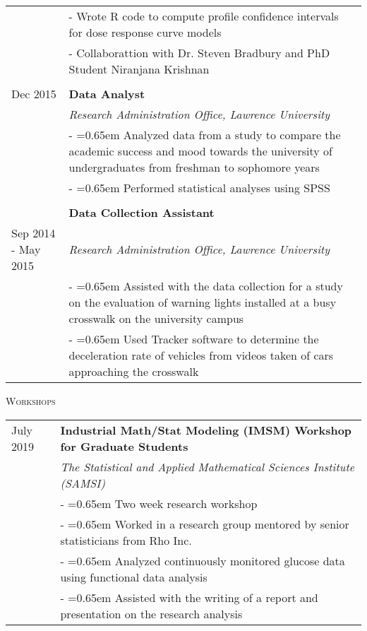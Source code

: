 \documentclass[10pt, oneside]{article}
\begin{document}
\begin{longtable}{p{3.5cm}p{13cm}}
& - Wrote R code to compute profile confidence intervals for dose response curve models\\
& - Collaborattion with Dr. Steven Bradbury and PhD Student Niranjana Krishnan\\
\\
\hfill{Dec 2015} & \textbf{Data Analyst}\\
& \emph{Research Administration Office, Lawrence University} \vspace{0.1cm}\\
& - \hangindent=0.65em \hangafter=1 Analyzed data from a study to compare the academic success and mood towards the university of undergraduates from freshman to sophomore years\\
& - \hangindent=0.65em \hangafter=1 Performed statistical analyses using SPSS\\
\\
& \textbf{Data Collection Assistant}\\
\hfill{Sep 2014 - May 2015} & \emph{Research Administration Office, Lawrence University} \vspace{0.1cm}\\
& - \hangindent=0.65em \hangafter=1 Assisted with the data collection for a study on the evaluation of warning lights installed at a busy crosswalk on the university campus\\
& - \hangindent=0.65em \hangafter=1 Used Tracker software to determine the deceleration rate of vehicles from videos taken of cars approaching the crosswalk
\end{longtable}

\noindent \textsc{Workshops} \hrulefill

\begin{longtable}{p{3.5cm}p{13cm}}
\hfill{July 2019} & \textbf{Industrial Math/Stat Modeling (IMSM) Workshop for Graduate Students}\\
& \emph{The Statistical and Applied Mathematical Sciences Institute (SAMSI)} \vspace{0.1cm}\\
& - \hangindent=0.65em \hangafter=1 Two week research workshop\\
& - \hangindent=0.65em \hangafter=1 Worked in a research group mentored by senior statisticians from Rho Inc.\\
& - \hangindent=0.65em \hangafter=1 Analyzed continuously monitored glucose data using functional data analysis\\
& - \hangindent=0.65em \hangafter=1 Assisted with the writing of a report and presentation on the research analysis\\
\end{longtable}
\end{document}
